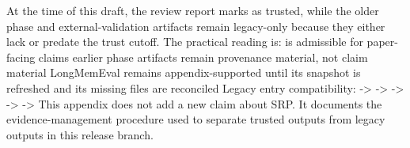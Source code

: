 {}At the time of this draft, the review report marks  as trusted, while the older phase and external-validation artifacts remain legacy-only because they either lack  or predate the trust cutoff.\markdownRendererParagraphSeparator
{}The practical reading is:\markdownRendererInterblockSeparator
{}\markdownRendererUlBeginTight
\markdownRendererUlItem {} is admissible for paper-facing claims\markdownRendererUlItemEnd 
\markdownRendererUlItem earlier phase artifacts remain provenance material, not claim material\markdownRendererUlItemEnd 
\markdownRendererUlItem LongMemEval remains appendix-supported until its snapshot is refreshed and its missing files are reconciled\markdownRendererUlItemEnd 
\markdownRendererUlEndTight \markdownRendererInterblockSeparator
{}Legacy entry compatibility:\markdownRendererInterblockSeparator
{}\markdownRendererUlBeginTight
\markdownRendererUlItem {} -> \markdownRendererUlItemEnd 
\markdownRendererUlItem {} -> \markdownRendererUlItemEnd 
\markdownRendererUlItem {} -> \markdownRendererUlItemEnd 
\markdownRendererUlItem {} -> \markdownRendererUlItemEnd 
\markdownRendererUlItem {} -> \markdownRendererUlItemEnd 
\markdownRendererUlEndTight \markdownRendererInterblockSeparator
{}This appendix does not add a new claim about SRP.\markdownRendererSoftLineBreak
{}It documents the evidence-management procedure used to separate trusted outputs from legacy outputs in this release branch.
\markdownRendererSectionEnd 
\markdownRendererSectionEnd 
\markdownRendererSectionEnd \markdownRendererDocumentEnd